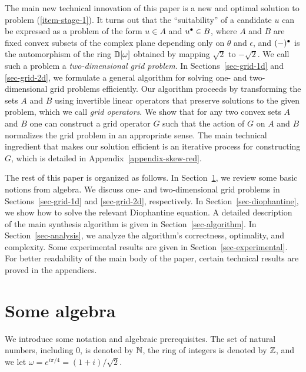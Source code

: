 \documentclass{article}
\begin{document}
The main new technical innovation of this paper is a new and optimal
solution to problem (\ref{item-stage-1}). It turns out that the
``suitability'' of a candidate $u$ can be expressed as a problem of
the form $u\in A$ and $u^{\bullet}\in B$, where $A$ and $B$ are fixed convex
subsets of the complex plane depending only on $\theta$ and
$\epsilon$, and $(-)^{\bullet}$ is the automorphism of the ring ${\mathbb{D}}[\omega]$
obtained by mapping $\sqrt2$ to $-\sqrt2$. We call such a problem a
{\em two-dimensional grid problem}. In Sections~\ref{sec-grid-1d} and
{\ref{sec-grid-2d}}, we formulate a general algorithm for solving one-
and two-dimensional grid problems efficiently. Our algorithm proceeds
by transforming the sets $A$ and $B$ using invertible linear operators
that preserve solutions to the given problem, which we call {\em grid
  operators}. We show that for any two convex sets $A$ and $B$ one can
construct a grid operator $G$ such that the action of $G$ on $A$ and
$B$ normalizes the grid problem in an appropriate sense. The main
technical ingredient that makes our solution efficient is an iterative
process for constructing $G$, which is detailed in
Appendix~\ref{appendix-skew-red}.

The rest of this paper is organized as follows. In
Section~\ref{sec-algebra}, we review some basic notions from
algebra. We discuss one- and two-dimensional grid problems in
Sections~\ref{sec-grid-1d} and {\ref{sec-grid-2d}}, respectively. In
Section~\ref{sec-diophantine}, we show how to solve the relevant
Diophantine equation. A detailed description of the main synthesis
algorithm is given in Section~\ref{sec-algorithm}. In
Section~\ref{sec-analysis}, we analyze the algorithm's correctness,
optimality, and complexity. Some experimental results are given in
Section~\ref{sec-experimental}. For better readability of the main
body of the paper, certain technical results are proved in the
appendices.

\section{Some algebra}
\label{sec-algebra}

We introduce some notation and algebraic prerequisites. The set of
natural numbers, including 0, is denoted by $\mathbb{N}$, the ring of integers
is denoted by $\mathbb{Z}$, and we let $\omega=e^{i\pi /4}=(1+i)/\sqrt 2$.
\end{document}
